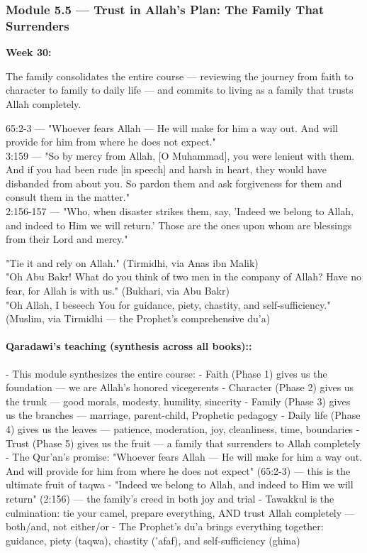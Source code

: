 \documentclass[11pt,a4paper]{article}
\begin{document}
\subsubsection*{Module 5.5 --- Trust in Allah's Plan: The Family That Surrenders}
\textbf{Week 30:} 

\begin{outcomebox} The family consolidates the entire course --- reviewing the journey from faith to character to family to daily life --- and commits to living as a family that trusts Allah completely. \end{outcomebox}

\begin{quranbox} 65:2-3 --- "Whoever fears Allah --- He will make for him a way out. And will provide for him from where he does not expect." \\ 3:159 --- "So by mercy from Allah, [O Muhammad], you were lenient with them. And if you had been rude [in speech] and harsh in heart, they would have disbanded from about you. So pardon them and ask forgiveness for them and consult them in the matter." \\ 2:156-157 --- "Who, when disaster strikes them, say, 'Indeed we belong to Allah, and indeed to Him we will return.' Those are the ones upon whom are blessings from their Lord and mercy." \end{quranbox}

\begin{hadithbox} "Tie it and rely on Allah." (Tirmidhi, via Anas ibn Malik) \\ "Oh Abu Bakr! What do you think of two men in the company of Allah? Have no fear, for Allah is with us." (Bukhari, via Abu Bakr) \\ "Oh Allah, I beseech You for guidance, piety, chastity, and self-sufficiency." (Muslim, via Tirmidhi --- the Prophet's comprehensive du'a) \end{hadithbox}

\paragraph*{Qaradawi's teaching (synthesis across all books)::}  - This module synthesizes the entire course: - Faith (Phase 1) gives us the foundation --- we are Allah's honored vicegerents - Character (Phase 2) gives us the trunk --- good morals, modesty, humility, sincerity - Family (Phase 3) gives us the branches --- marriage, parent-child, Prophetic pedagogy - Daily life (Phase 4) gives us the leaves --- patience, moderation, joy, cleanliness, time, boundaries - Trust (Phase 5) gives us the fruit --- a family that surrenders to Allah completely - The Qur'an's promise: "Whoever fears Allah --- He will make for him a way out. And will provide for him from where he does not expect" (65:2-3) --- this is the ultimate fruit of taqwa - "Indeed we belong to Allah, and indeed to Him we will return" (2:156) --- the family's creed in both joy and trial - Tawakkul is the culmination: tie your camel, prepare everything, AND trust Allah completely --- both/and, not either/or - The Prophet's du'a brings everything together: guidance, piety (taqwa), chastity ('afaf), and self-sufficiency (ghina)
\end{document}
